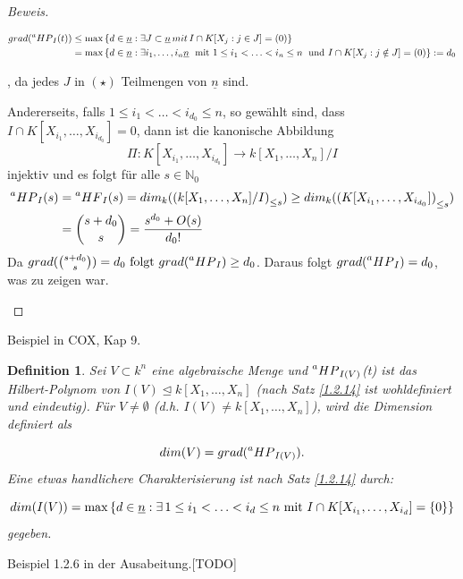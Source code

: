 \documentclass{article}
\newtheorem{definition}[satz]{Definition}
\newcommand*{\R}{k[X_{1},\ldots,X_{n}]}
\newcommand*{\indx}[2]{{#1}_{#2}}
\newcommand*{\N}{\mathbb{N}_0}
\newcommand*{\hf}[1]{$\prescript{a}{}{HF}_{#1}$}
\newcommand*{\hp}[1]{$\prescript{a}{}{HP}_{#1}$}
\begin{document}
\begin{proof}[Beweis]
\begin{compactenum}
		\begin{align*}
		grad(\textnormal{\hp{I}}(t))&\leq \max{\{d\in\underline{n}:\exists J\subset\underline{n}\, mit\,I\cap K[\indx{X}{j}:j\in J]=(0)\}}\\&
		= \max{\{d\in\underline{n}:\exists \indx{i}{1},\ldots,\indx{i}{n}\underline{n}\; \textnormal{ mit }  1\leq\indx{i}{1}<\ldots<\indx{i}{n}\leq n\;\textnormal{ und }I\cap K[\indx{X}{j}:j\notin J]=(0)\}}:=\indx{d}{0}
		\end{align*}
		
		, da jedes $J$ in $(\star)$ Teilmengen von $\underline{n}$ sind.
		
		Andererseits, falls $1\leq\indx{i}{1}<\ldots<\indx{i}{\indx{d}{0}}\leq n$, so gewählt sind, dass $I\cap K[\indx{X}{\indx{i}{1}},\ldots,\indx{X}{\indx{i}{\indx{d}{0}}}]={0}$, dann ist die kanonische Abbildung 
		\begin{displaymath}
		\Pi:K[\indx{X}{\indx{i}{1}},\ldots,\indx{X}{\indx{i}{\indx{d}{0}}}]\rightarrow\R/I
		\end{displaymath}
		injektiv und es folgt für alle $ s\in\N$
		\begin{align*}
		\textnormal{\hp{I}}(s)&=\textnormal{\hf{I}}(s)=\indx{dim}{k}(\indx{(\R/I)}{\leq s})\geq \indx{dim}{k}(\indx{(K[\indx{X}{\indx{i}{1}},\ldots,\indx{X}{\indx{i}{\indx{d}{0}}}])}{\leq s})\\&
		=\binom{s+\indx{d}{0}}{s}=\frac{s^{\indx{d}{0}}+O(s)}{\indx{d}{0}!}
		\end{align*}
		Da $grad(\binom{s+\indx{d}{0}}{s})=\indx{d}{0}\textnormal{ folgt } grad(\textnormal{\hp{I}})\geq \indx{d}{0}$. Daraus folgt $grad(\textnormal{\hp{I}})=\indx{d}{0}$, was zu zeigen war. 
	\end{compactenum}
\end{proof}

Beispiel in COX, Kap 9. \\
\begin{definition}
	Sei $V\subset k^n$ eine algebraische Menge und \hp{I(V)}(t) ist das Hilbert-Polynom von $I(V)\unlhd\R$ (nach Satz \ref{1.2.14} ist wohldefiniert und eindeutig). Für $V\neq\emptyset$ (d.h. $I(V)\neq\R$), wird die Dimension definiert als 
	
	\begin{displaymath}
	dim(V)=grad(\textnormal{\hp{I(V)}}).
	\end{displaymath}
	Eine etwas handlichere Charakterisierung ist nach Satz \ref{1.2.14} durch:
	
	\begin{displaymath}
	dim(I(V))=\max{\{d\in\underline{n}:\exists{\,} 1\leq\indx{i}{1}<\ldots<\indx{i}{d}\leq n \textnormal{ mit } I\cap K[\indx{X}{\indx{i}{1}},\ldots,\indx{X}{\indx{i}{d}}]=\{0\} \}}
	\end{displaymath}
	gegeben.\\
\end{definition}
Beispiel 1.2.6 in der Ausabeitung.[TODO] \\
\end{document}
